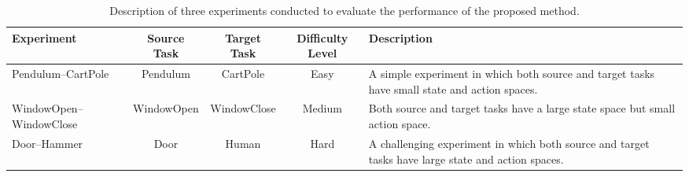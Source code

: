 \begin{landscape}
  \begin{table}[H]
    \centering
    \caption{Description of three experiments conducted to evaluate the performance of the proposed method.\label{ch:DTAIL:tab:Experiments}}

    \begin{tabular}{lcccp{5.5cm}}
      \toprule
      \textbf{Experiment}     & \textbf{Source Task} & \textbf{Target Task}                                                                               & \textbf{Difficulty Level} & \textbf{Description} \\
      \midrule
      Pendulum--CartPole      & Pendulum             & CartPole
                              & Easy                 & A simple experiment in which both source and target tasks have small state and action spaces.                                                         \\
      WindowOpen--WindowClose & WindowOpen           & WindowClose
                              & Medium               & Both source and target tasks have a large state space but small action space.                                                                         \\
      Door--Hammer            & Door                 & Human
                              & Hard                 & A challenging experiment in which both source and target tasks have large state and action spaces.                                                    \\
      \bottomrule
    \end{tabular}
  \end{table}
\end{landscape}

